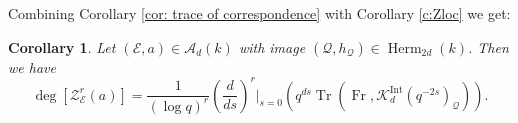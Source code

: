 \documentclass[reqno]{amsart}
\numberwithin{equation}{section}
\newcommand{\Q}{\mathbf{Q}}
\newcommand{\Cal}[1]{\mathcal{#1}}
\newcommand{\mrm}[1]{\mathrm{#1}}
\DeclareMathOperator{\Frob}{Fr}
\DeclareMathOperator{\Tr}{Tr}
\DeclareMathOperator{\Hk}{Hk}
\DeclareMathOperator{\Herm}{Herm}
\DeclareMathOperator{\Lagr}{Lagr}
\newcommand{\Qlbar}{\overline{\Q}_\ell}
\newcommand{\ov}{\overline}
\newcommand{\ph}{\varphi}
\newcommand{\s}{\sigma}
\newcommand\cA{\mathcal{A}}
\newcommand\cE{\mathcal{E}}
\newcommand\cF{\mathcal{F}}
\newcommand\cH{\mathcal{H}}
\newcommand\cK{\mathcal{K}}
\newcommand\cL{\mathcal{L}}
\newcommand\cM{\mathcal{M}}
\newcommand\cQ{\mathcal{Q}}
\newtheorem{cor}[thm]{Corollary}
\theoremstyle{remark}
\numberwithin{equation}{section}
\begin{document}
Combining Corollary \ref{cor: trace of correspondence} with Corollary \ref{c:Zloc} we get:
\begin{cor}\label{cor: KR degree as trace of Frob} Let $(\cE,a)\in \cA_{d}(k)$ with image $(\cQ,h_{\cQ})\in \Herm_{2d}(k)$. Then we have 
\[
\deg [\Cal{Z}^{r}_{\Cal{E}}(a)] = \frac{1}{(\log q)^r} \left(\frac{d}{ds}\right)^r\Big|_{s=0} \left(q^{ds}\Tr(\Frob, \cK_d^{\mrm{Int}}(q^{-2s})_{\cQ})\right).
\]
\end{cor}


%
%
\end{document}
